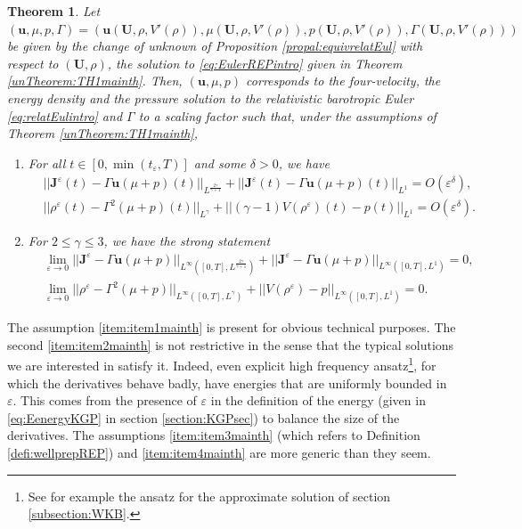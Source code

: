 \documentclass[a4paper, 15pt]{article}
\numberwithin{equation}{section}
\newtheorem{unTheorem}{Theorem}[section]
\begin{document}
\begin{unTheorem}
\label{unTheorem:TH2mainth} 
     Let $(\textbf{u},\mu,p,\Gamma)=(\textbf{u}(\textbf{U},\rho,V'(\rho)),\mu(\textbf{U},\rho,V'(\rho)),p(\textbf{U},\rho,V'(\rho)),\Gamma(\textbf{U},\rho,V'(\rho)))$ be given by the change of unknown of Proposition \ref{propal:equivrelatEul} with respect to $(\textbf{U},\rho)$, the solution to \eqref{eq:EulerREPintro} given in Theorem \ref{unTheorem:TH1mainth}. Then, $(\textbf{u},\mu,p)$ corresponds to the four-velocity, the energy density and the pressure solution to the relativistic barotropic Euler \eqref{eq:relatEulintro} and $\Gamma$ to a scaling factor such that, under the assumptions of Theorem \ref{unTheorem:TH1mainth},
    \begin{enumerate}[label=\roman*)]
    \label{itemize:pointsmainth2}
            \item \label{item:point4mainth}For all $t\in[0,\min(t_\varepsilon,T)]$ and some $\delta>0$, we have
\begin{align}
\label{eq:conv3mainth}
    &||\textbf{J}^\varepsilon(t)-\Gamma\textbf{u}(\mu+p)(t)||_{L^{\frac{2\gamma}{\gamma+1}}}+||\textbf{J}^\varepsilon(t)-\Gamma\textbf{u}(\mu+p)(t)||_{L^1}=O(\varepsilon^{\delta}),\\
    &||\rho^\varepsilon(t)-\Gamma^2(\mu+p)(t)||_{L^{\gamma}}+||(\gamma-1)V(\rho^\varepsilon)(t)-p(t)||_{L^{1}}=O(\varepsilon^{\delta}).
\end{align}    
    \item \label{item:point5mainth} For $2\leq\gamma\leq3$, we have the strong statement
      \begin{align}     
      \label{eq:conv4mainth}
      &\lim_{\varepsilon\to 0}||\textbf{J}^\varepsilon-\Gamma\textbf{u}(\mu+p)||_{L^\infty([0,T],L^{\frac{2\gamma}{\gamma+1}})}+||\textbf{J}^\varepsilon-\Gamma\textbf{u}(\mu+p)||_{L^\infty([0,T],L^1)}=0,\\
      &\lim_{\varepsilon\to 0}||\rho^\varepsilon-\Gamma^2(\mu+p)||_{L^\infty([0,T],L^{\gamma})}+||V(\rho^\varepsilon)-p||_{L^\infty([0,T],L^{1})}=0.
    \end{align}
    \end{enumerate}
    
\end{unTheorem}
The assumption \ref{item:item1mainth}  is present for obvious technical purposes. The second \ref{item:item2mainth} is not restrictive in the sense that the typical solutions we are interested in satisfy it. Indeed, even explicit high frequency ansatz\footnote{See for example the ansatz for the approximate solution of section \ref{subsection:WKB}.}, for which the derivatives behave badly, have energies that are uniformly bounded in $\varepsilon$. This comes from the presence of $\varepsilon$ in the definition of the energy (given in \eqref{eq:EenergyKGP} in section \ref{section:KGPsec}) to balance the size of the derivatives. The assumptions \ref{item:item3mainth} (which refers to Definition \ref{defi:wellprepREP}) and \ref{item:item4mainth} are more generic than they seem.
\end{document}
